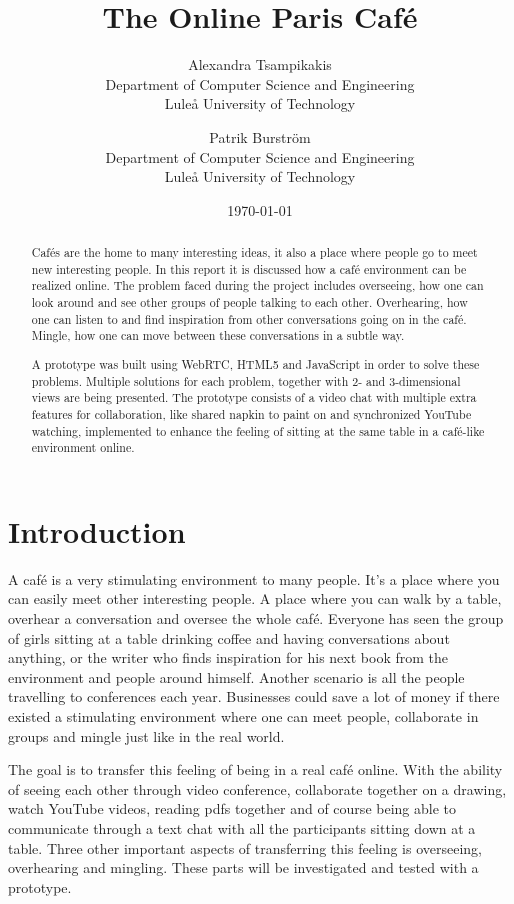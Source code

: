 \documentclass[12pt, titlepage]{article}
\title{The Online Paris Café}
\author{
        Alexandra Tsampikakis \\
                Department of Computer Science and Engineering\\
        Luleå University of Technology\\
            \and
        Patrik Burström\\
                Department of Computer Science and Engineering\\
        Luleå University of Technology\\
}
\date{\today}
\begin{document}
\newpage
\begin{abstract}
Cafés are the home to many interesting ideas, it also a place where people go to meet new interesting people. In this report it is discussed how a café environment can be realized online. The problem faced during the project includes overseeing, how one can look around and see other groups of people talking to each other. Overhearing, how one can listen to and find inspiration from other conversations going on in the café. Mingle, how one can move between these conversations in a subtle way.

A prototype was built using WebRTC, HTML5 and JavaScript in order to solve these problems. Multiple solutions for each problem, together with 2- and 3-dimensional views are being presented. The prototype consists of a video chat with multiple extra features for collaboration, like shared napkin to paint on and  synchronized YouTube watching, implemented to enhance the feeling of sitting at the same table in a café-like environment online. 
\end{abstract}
\tableofcontents
\clearpage
\section{Introduction}
A café is a very stimulating environment to many people. It’s a place where you can easily meet other interesting people. A place where you can walk by a table, overhear a conversation and oversee the whole café. Everyone has seen the group of girls sitting at a table drinking coffee and having conversations about anything, or the writer who finds inspiration for his next book from the environment and people around himself. Another scenario is all the people travelling to conferences each year. Businesses could save a lot of money if there existed a stimulating environment where one can meet people, collaborate in groups and mingle just like in the real world.

The goal is to transfer this feeling of being in a real café online. With the ability of seeing each other through video conference, collaborate together on a drawing, watch YouTube videos, reading pdfs together and of course being able to communicate through a text chat with all the participants sitting down at a table. Three other important aspects of transferring this feeling is overseeing, overhearing and mingling. These parts will be investigated and tested with a prototype.
\end{document}
